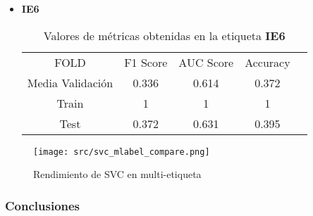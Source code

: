 \begin{itemize}
\begin{table}[H]
	      \end{table}
	\item  \textbf{IE6}
	      \begin{table}[H]
		      \centering
		      \begin{tabular}{|c|c|c|c|c}
			      \cline{1-4}
			      FOLD             & F1 Score & AUC Score & Accuracy \\ \cline{1-4}
			      Media Validación & 0.336    & 0.614     & 0.372    \\ \cline{1-4}
			      Train            & 1        & 1         & 1        \\ \cline{1-4}
			      Test             & 0.372    & 0.631     & 0.395    \\ \cline{1-4}
		      \end{tabular}
		      \caption{Valores de métricas obtenidas en la etiqueta \textbf{IE6}}
	      \end{table}
\end{itemize}

\begin{figure}[H]
	\centering
	\texttt{[image: src/svc\_mlabel\_compare.png]}
	\caption{Rendimiento de SVC en multi-etiqueta}
	\label{fig:svcml_cmp}
\end{figure}
\subsubsection*{Conclusiones}
